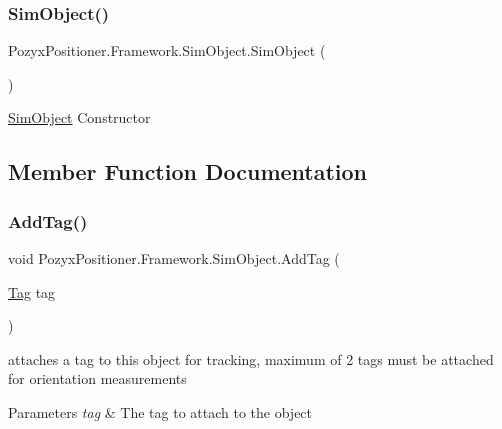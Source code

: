 \subsubsection{\texorpdfstring{Sim\+Object()}{SimObject()}}
{\footnotesize\ttfamily Pozyx\+Positioner.\+Framework.\+Sim\+Object.\+Sim\+Object (\begin{DoxyParamCaption}{ }\end{DoxyParamCaption})}



\hyperlink{class_pozyx_positioner_1_1_framework_1_1_sim_object}{Sim\+Object} Constructor 



\subsection{Member Function Documentation}
\mbox{\label{class_pozyx_positioner_1_1_framework_1_1_sim_object_a46185130a7147410af586622732ad64a}} 
\subsubsection{\texorpdfstring{Add\+Tag()}{AddTag()}}
{\footnotesize\ttfamily void Pozyx\+Positioner.\+Framework.\+Sim\+Object.\+Add\+Tag (\begin{DoxyParamCaption}\item[{\hyperlink{class_pozyx_positioner_1_1_framework_1_1_tag}{Tag}}]{tag }\end{DoxyParamCaption})}



attaches a tag to this object for tracking, maximum of 2 tags must be attached for orientation measurements 


\begin{DoxyParams}{Parameters}
{\em tag} & The tag to attach to the object \\
\hline
\end{DoxyParams}
\mbox{\label{class_pozyx_positioner_1_1_framework_1_1_sim_object_a222891687d37d968292c484b044803ca}} 
